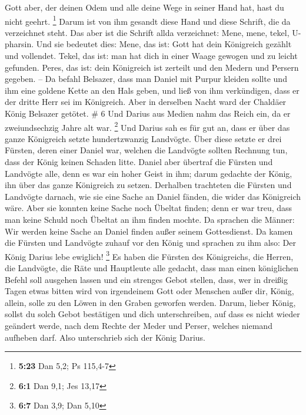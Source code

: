 Gott aber, der deinen Odem und alle deine Wege in seiner Hand hat, hast
du nicht geehrt. \footnote{\textbf{5:23} Dan 5,2; Ps 115,4-7}
 Darum ist von ihm gesandt diese Hand und diese Schrift,
die da verzeichnet steht.  Das aber ist die Schrift allda
verzeichnet: Mene, mene, tekel, U-pharsin.  Und sie
bedeutet dies: Mene, das ist: Gott hat dein Königreich gezählt und
vollendet.  Tekel, das ist: man hat dich in einer Waage
gewogen und zu leicht gefunden.  Peres, das ist: dein
Königreich ist zerteilt und den Medern und Persern gegeben. --
 Da befahl Belsazer, dass man Daniel mit Purpur kleiden
sollte und ihm eine goldene Kette an den Hals geben, und ließ von ihm
verkündigen, dass er der dritte Herr sei im Königreich. 
Aber in derselben Nacht ward der Chaldäer König Belsazer getötet. \# 6
 Und Darius aus Medien nahm das Reich ein, da er
zweiundsechzig Jahre alt war. \footnote{\textbf{6:1} Dan 9,1; Jes 13,17}
 Und Darius sah es für gut an, dass er über das ganze
Königreich setzte hundertzwanzig Landvögte.  Über diese
setzte er drei Fürsten, deren einer Daniel war, welchen die Landvögte
sollten Rechnung tun, dass der König keinen Schaden litte. 
Daniel aber übertraf die Fürsten und Landvögte alle, denn es war ein
hoher Geist in ihm; darum gedachte der König, ihn über das ganze
Königreich zu setzen.  Derhalben trachteten die Fürsten und
Landvögte darnach, wie sie eine Sache an Daniel fänden, die wider das
Königreich wäre. Aber sie konnten keine Sache noch Übeltat finden; denn
er war treu, dass man keine Schuld noch Übeltat an ihm finden mochte.
 Da sprachen die Männer: Wir werden keine Sache an Daniel
finden außer seinem Gottesdienst.  Da kamen die Fürsten und
Landvögte zuhauf vor den König und sprachen zu ihm also: Der König
Darius lebe ewiglich! \footnote{\textbf{6:7} Dan 3,9; Dan 5,10}
 Es haben die Fürsten des Königreichs, die Herren, die
Landvögte, die Räte und Hauptleute alle gedacht, dass man einen
königlichen Befehl soll ausgehen lassen und ein strenges Gebot stellen,
dass, wer in dreißig Tagen etwas bitten wird von irgendeinem Gott oder
Menschen außer dir, König, allein, solle zu den Löwen in den Graben
geworfen werden.  Darum, lieber König, sollst du solch Gebot
bestätigen und dich unterschreiben, auf dass es nicht wieder geändert
werde, nach dem Rechte der Meder und Perser, welches niemand aufheben
darf.  Also unterschrieb sich der König Darius.
